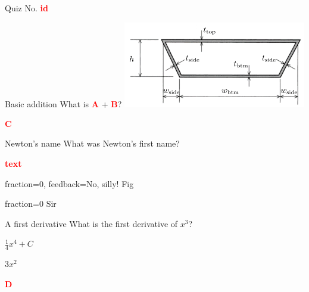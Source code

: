 \documentclass[12pt]{article}
\newcommand*{\VAR}[1]{\textcolor{red}{\textbf{#1}}}
\begin{document}
\begin{quiz}{Quiz No. \VAR{id}}
\begin{numerical}[points=2]{Basic addition}
What is \VAR{A} + \VAR{B}?
\includegraphics[width=8cm]{./media/image1}
\item \VAR{C}
\end{numerical}


\begin{shortanswer}[case sensitive=true]{Newton’s name}
What was Newton's first name?
\item* \VAR{text}
\item[fraction=0, feedback={No, silly!}] Fig
\item[fraction=0] Sir
\end{shortanswer}
\begin{multi}[points=3]{A first derivative}
What is the first derivative of $x^3$?
\item $\frac{1}{4} x^4+C$
\item* $3x^2$
\item \VAR{D}
\end{multi}
\end{quiz}
\end{document}
